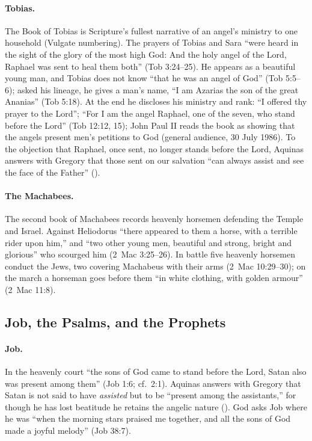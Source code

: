 \paragraph{Tobias.} The Book of Tobias is Scripture's fullest narrative of
an angel's ministry to one household (Vulgate numbering). The prayers of Tobias and Sara
``were heard in the sight of the glory of the most high God: And the holy
angel of the Lord, Raphael was sent to heal them both'' (Tob 3:24--25). He appears as a beautiful young man, and Tobias does not know ``that he
was an angel of God'' (Tob 5:5--6); asked his lineage, he gives a man's
name, ``I am Azarias the son of the great Ananias'' (Tob 5:18). At the end
he discloses his ministry and rank: ``I offered thy prayer to the Lord'';
``For I am the angel Raphael, one of the seven, who stand before the
Lord'' (Tob 12:12, 15); John Paul II reads the book as showing that the
angels present men's petitions to God (general audience, 30 July 1986). To
the objection that Raphael, once sent, no longer stands before the Lord,
Aquinas answers with Gregory that those sent on our salvation ``can always
assist and see the face of the Father'' ().

\paragraph{The Machabees.} The second book of Machabees records heavenly
horsemen defending the Temple and Israel. Against Heliodorus ``there
appeared to them a horse, with a terrible rider upon him,'' and ``two other
young men, beautiful and strong, bright and glorious'' who scourged him
(2~Mac 3:25--26). In battle five heavenly horsemen conduct the Jews, two covering Machabeus
with their arms (2~Mac 10:29--30); on the march a horseman goes before
them ``in white clothing, with golden armour'' (2~Mac 11:8).

\subsection{Job, the Psalms, and the Prophets}

\paragraph{Job.} In the heavenly court ``the sons of God came to stand
before the Lord, Satan also was present among them'' (Job 1:6; cf.\ 2:1).
Aquinas answers with Gregory that Satan is not said to have
\emph{assisted} but to be ``present among the assistants,'' for though he
has lost beatitude he retains the angelic nature (). God asks Job where he was ``when the morning stars praised me
together, and all the sons of God made a joyful melody'' (Job 38:7).

